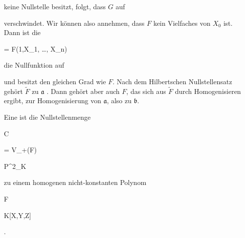 {{{    }{
}

{   }{
}

}
{}{}{}
keine Nullstelle besitzt, folgt, dass $G$ auf

 verschwindet. Wir können also annehmen, dass $F$ kein Vielfaches von $X_0$ ist. Dann ist die


\mavergleichskettedisp

{\vergleichskette

{ 
}

{ =} { F(1,X_1, \ldots, X_n)
}

{ } {
}

{ } {
}

{ } {
}

}
{}{}{}
die Nullfunktion auf

 und besitzt den gleichen Grad wie $F$. Nach dem
Hilbertschen Nullstellensatz
gehört $\tilde{  F  }$ zu ${\mathfrak a}$
 {} {.}
Dann gehört aber auch $F$, das sich aus $\tilde{  F  }$ durch Homogenisieren ergibt, zur Homogenisierung von ${\mathfrak a}$, also zu ${\mathfrak b}$.


}





{}

{


Eine  ist die Nullstellenmenge


\mavergleichskette

{\vergleichskette

{C
}

{ = }{ V_+(F)
}

{ \subset }{ {\mathbb P}^{2}_{K}
}

{    }{
}

{   }{
}

}
{}{}{}
zu einem homogenen nicht-konstanten Polynom


\mavergleichskette

{\vergleichskette

{F
}

{ \in }{ K[X,Y,Z]
}

{  }{
}

{    }{
}

{   }{
}

}
{}{}{.}


}



